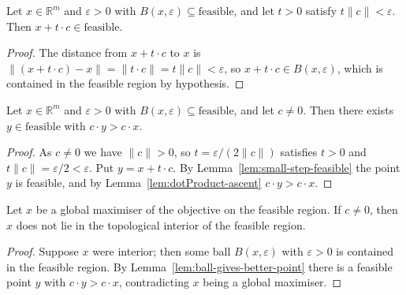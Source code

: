 \begin{lemma}
    \label{lem:small-step-feasible}
    \leanok
    Let $x \in \mathbb{R}^m$ and $\varepsilon > 0$ with
    $B(x, \varepsilon) \subseteq \mathrm{feasible}$, and let $t > 0$ satisfy
    $t \lVert c \rVert < \varepsilon$. Then $x + t \cdot c \in \mathrm{feasible}$.
\end{lemma}
\begin{proof}
    The distance from $x + t \cdot c$ to $x$ is
    $\lVert (x + t \cdot c) - x \rVert = \lVert t \cdot c \rVert = t \lVert c \rVert < \varepsilon$,
    so $x + t \cdot c \in B(x, \varepsilon)$, which is contained in the feasible
    region by hypothesis.
\end{proof}

\begin{lemma}
    \label{lem:ball-gives-better-point}
    \leanok
    Let $x \in \mathbb{R}^m$ and $\varepsilon > 0$ with
    $B(x, \varepsilon) \subseteq \mathrm{feasible}$, and let $c \ne 0$. Then there
    exists $y \in \mathrm{feasible}$ with $c \cdot y > c \cdot x$.
\end{lemma}
\begin{proof}
    As $c \ne 0$ we have $\lVert c \rVert > 0$, so
    $t = \varepsilon / (2 \lVert c \rVert)$ satisfies $t > 0$ and
    $t \lVert c \rVert = \varepsilon/2 < \varepsilon$. Put $y = x + t \cdot c$. By
    Lemma~\ref{lem:small-step-feasible} the point $y$ is feasible, and by
    Lemma~\ref{lem:dotProduct-ascent} $c \cdot y > c \cdot x$.
\end{proof}

\begin{lemma}
    \label{lem:max-not-interior}
    \leanok
    Let $x$ be a global maximiser of the objective on the feasible region. If
    $c \ne 0$, then $x$ does not lie in the topological interior of the feasible
    region.
\end{lemma}
\begin{proof}
    Suppose $x$ were interior; then some ball $B(x, \varepsilon)$ with
    $\varepsilon > 0$ is contained in the feasible region. By
    Lemma~\ref{lem:ball-gives-better-point} there is a feasible point $y$ with
    $c \cdot y > c \cdot x$, contradicting $x$ being a global maximiser.
\end{proof}

